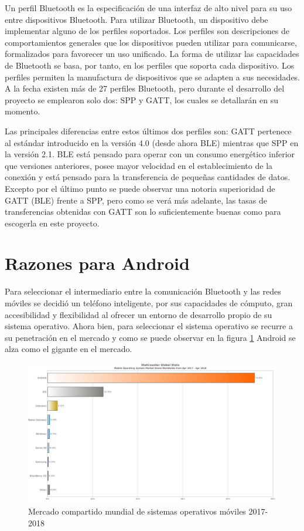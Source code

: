 Un perfil Bluetooth es la especificación de una interfaz de alto nivel para su uso entre dispositivos Bluetooth. Para utilizar Bluetooth, un dispositivo debe implementar alguno de los perfiles soportados.
Los perfiles son descripciones de comportamientos generales que los dispositivos pueden utilizar para comunicarse, formalizados para favorecer un uso unificado. La forma de utilizar las capacidades de Bluetooth se basa, por tanto, en los perfiles que soporta cada dispositivo. Los perfiles permiten la manufactura de dispositivos que se adapten a sus necesidades.\\

A la fecha existen más de 27 perfiles Bluetooth, pero durante el desarrollo del proyecto se emplearon solo dos: SPP y GATT, los cuales se detallarán en su momento.

Las principales diferencias entre estos últimos dos perfiles son: GATT pertenece al estándar introducido en la versión 4.0 (desde ahora BLE) mientras que SPP en la versión 2.1. BLE está pensado para operar con un consumo energético inferior que versiones anteriores, posee mayor velocidad en el establecimiento de la conexión y está pensado para la transferencia de pequeñas cantidades de datos. Excepto por el último punto se puede observar una notoria superioridad de GATT (BLE) frente a SPP, pero como se verá más adelante, las tasas de transferencias obtenidas con GATT son lo suficientemente buenas como para escogerla en este proyecto.

\newpage
\section{Razones para Android}

Para seleccionar el intermediario entre la comunicación Bluetooth y las redes móviles se decidió un teléfono inteligente, por sus capacidades de cómputo, gran accesibilidad y flexibilidad al ofrecer un entorno de desarrollo propio de su sistema operativo. Ahora bien, para seleccionar el sistema operativo se recurre a su penetración en el mercado y como se puede observar en la figura \ref{market_share} Android se alza como el gigante en el mercado.

\begin{figure}[H]
	\centering
	\includegraphics[scale=0.4]{figuras/comunicacion/Market_share.png}
	\caption{Mercado compartido mundial de sistemas operativos móviles 2017-2018 \cite{market_share_cita}}
	\label{market_share}
\end{figure}

